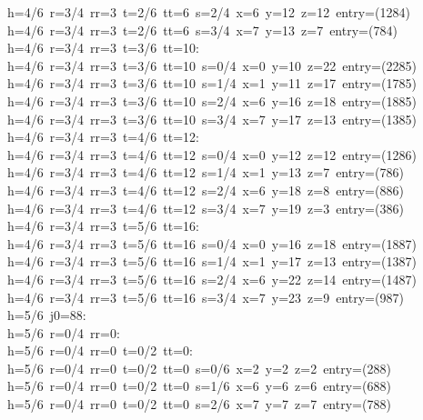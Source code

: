 \begin{tabbing}
h=4/6\ r=3/4\ rr=3\ t=2/6\ tt=6\ s=2/4\ x=6\ y=12\ z=12\ entry=(1284)\\[0pt]
h=4/6\ r=3/4\ rr=3\ t=2/6\ tt=6\ s=3/4\ x=7\ y=13\ z=7\ entry=(784)\\[0pt]
h=4/6\ r=3/4\ rr=3\ t=3/6\ tt=10:\\[0pt]
h=4/6\ r=3/4\ rr=3\ t=3/6\ tt=10\ s=0/4\ x=0\ y=10\ z=22\ entry=(2285)\\[0pt]
h=4/6\ r=3/4\ rr=3\ t=3/6\ tt=10\ s=1/4\ x=1\ y=11\ z=17\ entry=(1785)\\[0pt]
h=4/6\ r=3/4\ rr=3\ t=3/6\ tt=10\ s=2/4\ x=6\ y=16\ z=18\ entry=(1885)\\[0pt]
h=4/6\ r=3/4\ rr=3\ t=3/6\ tt=10\ s=3/4\ x=7\ y=17\ z=13\ entry=(1385)\\[0pt]
h=4/6\ r=3/4\ rr=3\ t=4/6\ tt=12:\\[0pt]
h=4/6\ r=3/4\ rr=3\ t=4/6\ tt=12\ s=0/4\ x=0\ y=12\ z=12\ entry=(1286)\\[0pt]
h=4/6\ r=3/4\ rr=3\ t=4/6\ tt=12\ s=1/4\ x=1\ y=13\ z=7\ entry=(786)\\[0pt]
h=4/6\ r=3/4\ rr=3\ t=4/6\ tt=12\ s=2/4\ x=6\ y=18\ z=8\ entry=(886)\\[0pt]
h=4/6\ r=3/4\ rr=3\ t=4/6\ tt=12\ s=3/4\ x=7\ y=19\ z=3\ entry=(386)\\[0pt]
h=4/6\ r=3/4\ rr=3\ t=5/6\ tt=16:\\[0pt]
h=4/6\ r=3/4\ rr=3\ t=5/6\ tt=16\ s=0/4\ x=0\ y=16\ z=18\ entry=(1887)\\[0pt]
h=4/6\ r=3/4\ rr=3\ t=5/6\ tt=16\ s=1/4\ x=1\ y=17\ z=13\ entry=(1387)\\[0pt]
h=4/6\ r=3/4\ rr=3\ t=5/6\ tt=16\ s=2/4\ x=6\ y=22\ z=14\ entry=(1487)\\[0pt]
h=4/6\ r=3/4\ rr=3\ t=5/6\ tt=16\ s=3/4\ x=7\ y=23\ z=9\ entry=(987)\\[0pt]
h=5/6\ j0=88:\\[0pt]
h=5/6\ r=0/4\ rr=0:\\[0pt]
h=5/6\ r=0/4\ rr=0\ t=0/2\ tt=0:\\[0pt]
h=5/6\ r=0/4\ rr=0\ t=0/2\ tt=0\ s=0/6\ x=2\ y=2\ z=2\ entry=(288)\\[0pt]
h=5/6\ r=0/4\ rr=0\ t=0/2\ tt=0\ s=1/6\ x=6\ y=6\ z=6\ entry=(688)\\[0pt]
h=5/6\ r=0/4\ rr=0\ t=0/2\ tt=0\ s=2/6\ x=7\ y=7\ z=7\ entry=(788)\\[0pt]

\end{tabbing}
